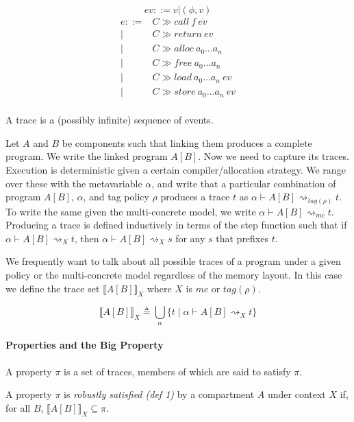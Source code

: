\documentclass{article}
\begin{document}
\[ev ::= v | (\phi, v)\]
\[\begin{split}
e ::= & C \gg \mathit{call} ~ f ~ \overline{ev} \\
| & C \gg \mathit{return} ~ ev \\
| & C \gg \mathit{alloc} ~ a_0 \dots a_n \\
| & C \gg \mathit{free} ~ a_0 \dots a_n \\
| & C \gg \mathit{load} ~ a_0 \dots a_n ~ ev \\
| & C \gg \mathit{store} ~ a_0 \dots a_n ~ ev \\
\end{split}\]

A trace is a (possibly infinite) sequence of events.

Let \(A\) and \(B\) be components such that linking them produces a complete program.
We write the linked program \(A[B]\). Now we need to capture its traces. Execution is
deterministic given a certain compiler/allocation strategy. We range over these with
the metavariable \(\alpha\), and write that a particular combination of program \(A[B]\),
\(\alpha\), and tag policy \(\rho\) produces a trace \(t\) as
\(\alpha \vdash A[B] \rightsquigarrow_{\mathit{tag(\rho)}} t\). To write the same given
the multi-concrete model, we write \(\alpha \vdash A[B] \rightsquigarrow_{\mathit{mc}} t\).
Producing a trace is defined inductively
in terms of the step function such that if \(\alpha \vdash A[B] \rightsquigarrow_X t\),
then \(\alpha \vdash A[B] \rightsquigarrow_X s\) for any \(s\) that prefixes \(t\).

We frequently want to talk about all possible traces of a program under a given policy
or the multi-concrete model regardless of the memory layout. In this case we define the
trace set \(\llbracket A[B] \rrbracket_X\) where \(X\) is \(\mathit{mc}\) or \(\mathit{tag}(\rho)\).

\[\llbracket A[B] \rrbracket_X \triangleq \bigcup_{\alpha}
\{ t \mid \alpha \vdash A[B] \rightsquigarrow_X t \}\]

\paragraph{Properties and the Big Property}

A property \(\pi\) is a set of traces, members of which are said to satisfy \(\pi\).

A property \(\pi\) is {\em robustly satisfied (def 1)} by a compartment \(A\) under context \(X\)
if, for all \(B\), \(\llbracket A[B] \rrbracket_X \subseteq \pi\).
\end{document}
